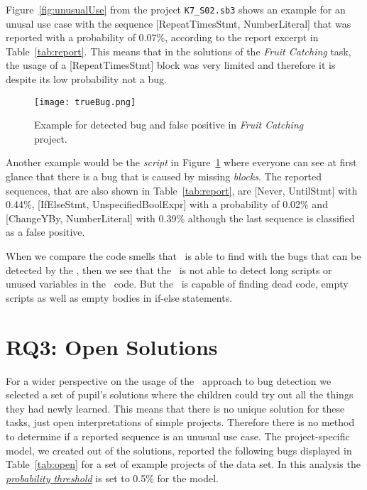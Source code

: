 Figure~\ref{fig:unusualUse} from the project \texttt{K7\_S02.sb3} shows an example for an unusal use case with the sequence [RepeatTimesStmt, NumberLiteral] that was reported with a probability of 0.07\%, according to the report excerpt in Table~\ref{tab:report}. This means that in the solutions of the \textit{Fruit Catching} task, the usage of a [RepeatTimesStmt] block was very limited and therefore it is despite its low probability not a bug.  

\begin{figure}[H]
    \centering
    \texttt{[image: trueBug.png]}
    \caption[Example for detected bug and false positive in \textit{Fruit Catching} project]{\label{fig:trueBug}Example for detected bug and false positive in \textit{Fruit Catching} project.}
\end{figure}

Another example would be the \textit{script} in Figure~\ref{fig:trueBug} where everyone can see at first glance that there is a bug that is caused by missing \textit{blocks}. The reported sequences, that are also shown in Table~\ref{tab:report}, are [Never, UntilStmt] with 0.44\%, [IfElseStmt, UnspecifiedBoolExpr] with a probability of 0.02\% and [ChangeYBy, NumberLiteral] with 0.39\% although the last sequence is classified as a false positive. 

When we compare the code smells that \litterbox\ is able to find with the bugs that can be detected by the \ngram{}, then we see that the \ngram\ is not able to detect long scripts or unused variables in the \scratch\ code. But the \ngram\ is capable of finding dead code, empty scripts as well as empty bodies in if-else statements. 
 

\section{RQ3: Open Solutions}\label{sec:open}
For a wider perspective on the usage of the \ngram\ approach to bug detection we selected a set of pupil's solutions where the children could try out all the things they had newly learned. This means that there is no unique solution for these tasks, just open interpretations of simple projects. Therefore there is no method to determine if a reported sequence is an unusual use case. The project-specific model, we created out of the solutions, reported the following bugs displayed in Table~\ref{tab:open} for a set of example projects of the data set. In this analysis the \hyperref[def:probability_threshold]{\textit{probability threshold}} is set to 0.5\% for the model. 

